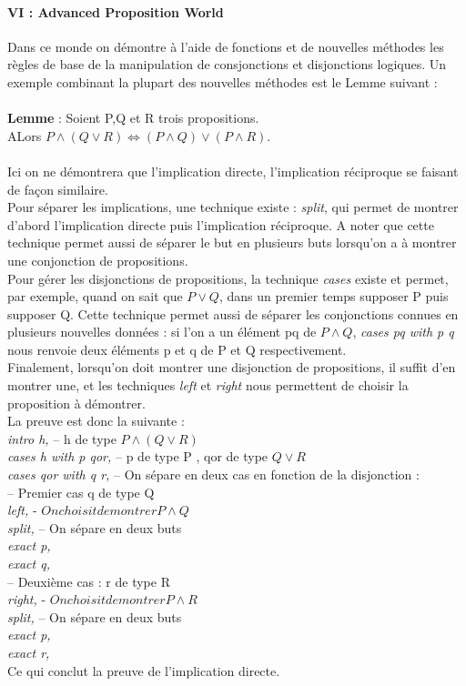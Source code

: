 \documentclass[french,frenchkw]{article}
\begin{document}
\paragraph{VI : Advanced Proposition World}
Dans ce monde on démontre à l'aide de fonctions et de nouvelles méthodes les règles de base de la manipulation de consjonctions et disjonctions logiques. Un exemple combinant la plupart des nouvelles méthodes est le Lemme suivant : \\
\\
\textbf{Lemme} : Soient P,Q et R trois propositions. \\
ALors $P\land(Q\lor R) \Longleftrightarrow (P\land Q)\lor(P\land R)$.\\
\\
Ici on ne démontrera que l'implication directe, l'implication réciproque se faisant de façon similaire.\\
Pour séparer les implications, une technique existe : \textit{split}, qui permet de montrer d'abord l'implication directe puis l'implication réciproque. A noter que cette technique permet aussi de séparer le but en plusieurs buts lorsqu'on a à montrer une conjonction de propositions.\\
Pour gérer les disjonctions de propositions, la technique \textit{cases} existe et permet, par exemple, quand on sait que $P\lor Q$, dans un premier temps supposer P puis supposer Q. Cette technique permet aussi de séparer les conjonctions connues en plusieurs nouvelles données : si l'on a un élément pq de $P\land Q$, \textit{cases pq with p q} nous renvoie deux éléments p et q de P et Q respectivement.\\
Finalement, lorsqu'on doit montrer une disjonction de propositions, il suffit d'en montrer une, et les techniques \textit{left} et \textit{right} nous permettent de choisir la proposition à démontrer.\\
La preuve est donc la suivante : \\
\textit{intro h,}     -- h de type $P\land (Q\lor R)$\\ 
\textit{cases h with p qor,}     -- p de type P , qor de type $Q\lor R$\\
\textit{cases qor with q r,}     -- On sépare en deux cas en fonction de la disjonction :\\ 

-- Premier cas q de type Q\\
\textit{left,}   - $On choisit de montrer P\land Q$\\
\textit{split,}     -- On sépare en deux buts\\
\textit{exact p,}\\
\textit{exact q,}\\

-- Deuxième cas : r de type R\\
\textit{right,}     - $On choisit de montrer P\land R$\\
\textit{split,}     -- On sépare en deux buts\\
\textit{exact p,}\\
\textit{exact r,}\\
Ce qui conclut la preuve de l'implication directe.


\end{document}
